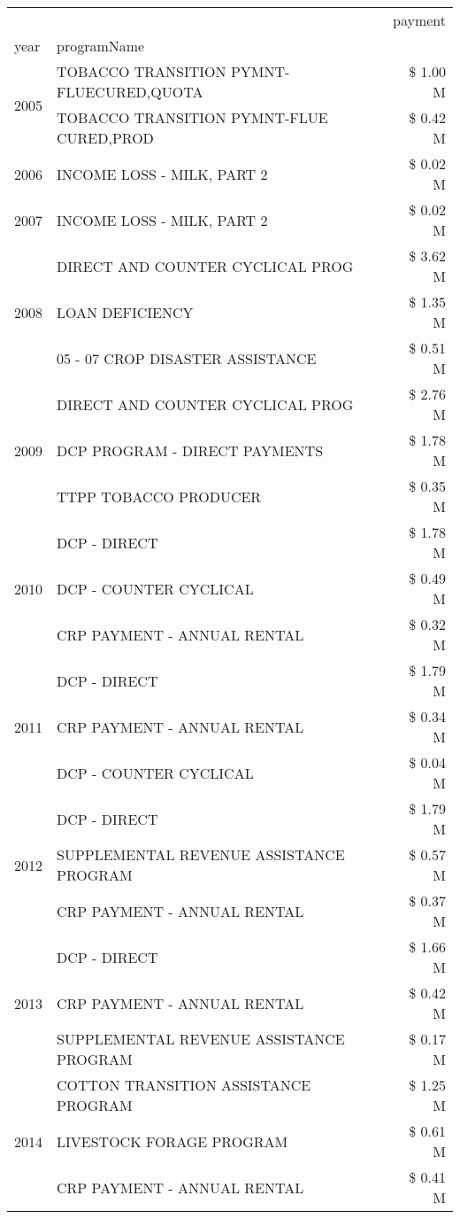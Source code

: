 \begin{tabular}{llr}
\toprule
 &  & payment \\
year & programName &  \\
\midrule
\multirow[t]{2}{*}{2005} & TOBACCO TRANSITION PYMNT-FLUECURED,QUOTA & \$ 1.00 M \\
 & TOBACCO TRANSITION PYMNT-FLUE CURED,PROD & \$ 0.42 M \\
\cline{1-3}
2006 & INCOME LOSS - MILK, PART 2 & \$ 0.02 M \\
\cline{1-3}
2007 & INCOME LOSS - MILK, PART 2 & \$ 0.02 M \\
\cline{1-3}
\multirow[t]{3}{*}{2008} & DIRECT AND COUNTER CYCLICAL PROG & \$ 3.62 M \\
 & LOAN DEFICIENCY & \$ 1.35 M \\
 & 05 - 07 CROP DISASTER ASSISTANCE & \$ 0.51 M \\
\cline{1-3}
\multirow[t]{3}{*}{2009} & DIRECT AND COUNTER CYCLICAL PROG & \$ 2.76 M \\
 & DCP PROGRAM - DIRECT PAYMENTS & \$ 1.78 M \\
 & TTPP TOBACCO PRODUCER & \$ 0.35 M \\
\cline{1-3}
\multirow[t]{3}{*}{2010} & DCP - DIRECT & \$ 1.78 M \\
 & DCP - COUNTER CYCLICAL & \$ 0.49 M \\
 & CRP PAYMENT - ANNUAL RENTAL & \$ 0.32 M \\
\cline{1-3}
\multirow[t]{3}{*}{2011} & DCP - DIRECT & \$ 1.79 M \\
 & CRP PAYMENT - ANNUAL RENTAL & \$ 0.34 M \\
 & DCP - COUNTER CYCLICAL & \$ 0.04 M \\
\cline{1-3}
\multirow[t]{3}{*}{2012} & DCP - DIRECT & \$ 1.79 M \\
 & SUPPLEMENTAL REVENUE ASSISTANCE PROGRAM & \$ 0.57 M \\
 & CRP PAYMENT - ANNUAL RENTAL & \$ 0.37 M \\
\cline{1-3}
\multirow[t]{3}{*}{2013} & DCP - DIRECT & \$ 1.66 M \\
 & CRP PAYMENT - ANNUAL RENTAL & \$ 0.42 M \\
 & SUPPLEMENTAL REVENUE ASSISTANCE PROGRAM & \$ 0.17 M \\
\cline{1-3}
\multirow[t]{3}{*}{2014} & COTTON TRANSITION ASSISTANCE PROGRAM & \$ 1.25 M \\
 & LIVESTOCK FORAGE PROGRAM & \$ 0.61 M \\
 & CRP PAYMENT - ANNUAL RENTAL & \$ 0.41 M \\

\end{tabular}
